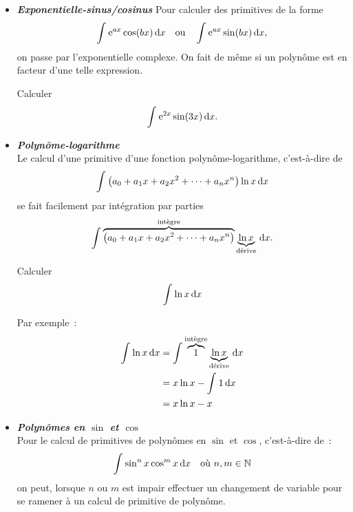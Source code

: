 \documentclass{magnoliaold}
\begin{document}
\begin{itemize}
\item \emph{\bf Exponentielle-sinus/cosinus}
  Pour calculer des primitives de la forme
  \[\int_{}^{} {\rm e}^{a x} \cos( bx)\,\text{d}x \quad\text{ou}\quad \int_{}^{} {\rm e}^{a x} \sin(bx)\,\text{d}x,\]
  on passe par l'exponentielle complexe. On fait de même si un polynôme est en facteur d'une telle expression.
  \begin{exoUnique}
  \exo Calculer
  \[\int_{}^{} {\rm e}^{2x} \sin(3x)\,\text{d}x.\]  
  \end{exoUnique}
\item \emph{\bf Polynôme-logarithme}\\
  Le calcul d'une primitive d'une fonction polynôme-logarithme, c'est-à-dire
  de
  $$\int_{}^{} \left(a_0+a_1 x+a_2 x^2+\dots+a_n x^n\right)\ln x\,\text{d}x$$
  se fait facilement par intégration par parties
  $$\int_{}^{} \overbrace{\left(a_0+a_1 x+a_2 x^2+\dots+a_n x^n\right)}^{\text{int\`egre}} \underbrace{\ln x}_{\text{d\'erive}}\,\text{d}x.$$
    \begin{exoUnique}
  \exo Calculer
  \[\int_{}^{} \ln x\,\text{d}x\]%
    \begin{sol}
  Par exemple~:
  \begin{equation*}
  \begin{split}
  \int_{}^{} \ln x\,\text{d}x&=\int_{}^{} \overbrace{1}^{\text{int\`egre}} \underbrace{\ln x}_{\text{d\'erive}}\,\text{d}x\\
                 &=x\ln x-\int_{}^{} 1\,\text{d}x\\
                 &=x\ln x-x
  \end{split}
  \end{equation*}
    \end{sol}
  \end{exoUnique}
\item \emph{\bf Polynômes en $\sin$ et $\cos$}\\
  Pour le calcul de primitives de polynômes en $\sin$ et $\cos$, c'est-à-dire
  de~:
  $$\int_{}^{} \sin^n x \cos^m x\,\text{d}x \quad \text{où $n,m\in\mathbb{N}$}$$
  on peut, lorsque $n$ ou $m$ est impair effectuer un changement de variable
  pour se ramener à un calcul de primitive de polynôme.

\end{itemize}
\end{document}
